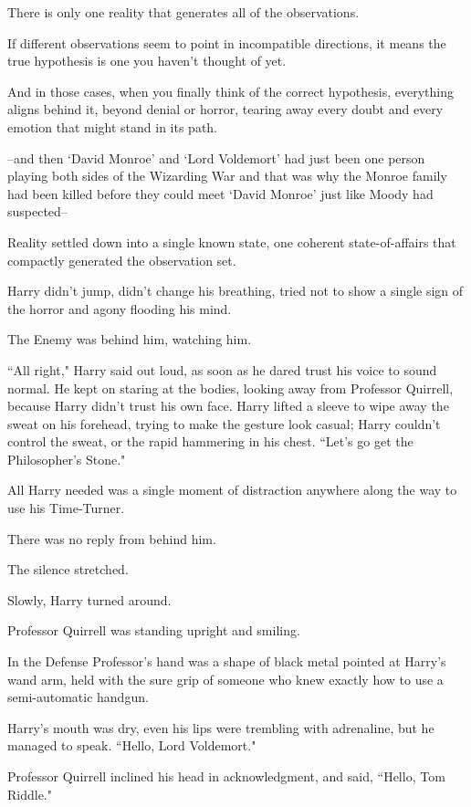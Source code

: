 There is only one reality that generates all of the observations.

If different observations seem to point in incompatible directions, it means the true hypothesis is one you haven't thought of yet.

And in those cases, when you finally think of the correct hypothesis, everything aligns behind it, beyond denial or horror, tearing away every doubt and every emotion that might stand in its path.

\---and then `David Monroe' and `Lord Voldemort' had just been one person playing both sides of the Wizarding War and that was why the Monroe family had been killed before they could meet `David Monroe' just like Moody had suspected\---

Reality settled down into a single known state, one coherent state-of-affairs that compactly generated the observation set.

Harry didn't jump, didn't change his breathing, tried not to show a single sign of the horror and agony flooding his mind.

The Enemy was behind him, watching him.

``All right," Harry said out loud, as soon as he dared trust his voice to sound normal. He kept on staring at the bodies, looking away from Professor Quirrell, because Harry didn't trust his own face. Harry lifted a sleeve to wipe away the sweat on his forehead, trying to make the gesture look casual; Harry couldn't control the sweat, or the rapid hammering in his chest. ``Let's go get the Philosopher's Stone."

All Harry needed was a single moment of distraction anywhere along the way to use his Time-Turner.

There was no reply from behind him.

The silence stretched.

Slowly, Harry turned around.

Professor Quirrell was standing upright and smiling.

In the Defense Professor's hand was a shape of black metal pointed at Harry's wand arm, held with the sure grip of someone who knew exactly how to use a semi-automatic handgun.

Harry's mouth was dry, even his lips were trembling with adrenaline, but he managed to speak. ``Hello, Lord Voldemort."

Professor Quirrell inclined his head in acknowledgment, and said, ``Hello, Tom Riddle."

